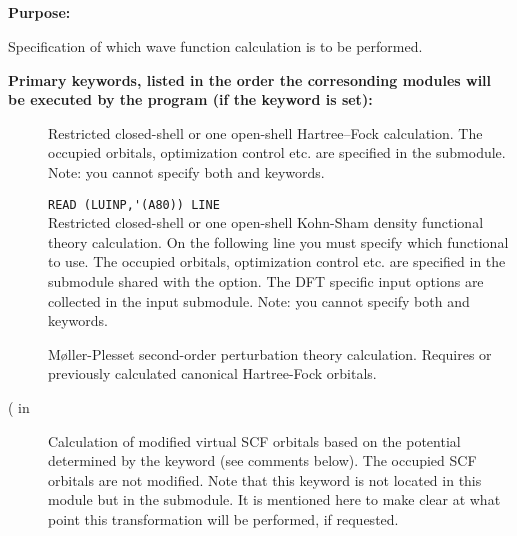 \pagebreak[3]
\subsection{\label{ref-geninp}}

{\bf Purpose:}

Specification of which wave function calculation is to be performed.

{\bf Primary keywords, listed in the order the corresonding modules
 will be executed by the program (if the keyword is set): }

\begin{description}

\item[]
  Restricted closed-shell or one open-shell 
  Hartree--Fock calculation.
  The occupied orbitals, optimization control etc. are specified in the
   submodule.
  Note: you cannot specify both  and  keywords.

\item[]
  \verb"READ (LUINP,'(A80)) LINE" \\
  Restricted closed-shell or one open-shell Kohn-Sham
  density functional theory calculation.
  On the following line you must specify which functional to use.
  The occupied orbitals, optimization control etc. are specified in the
   submodule shared with the  option.
  The DFT specific input options are collected in the  input submodule.
  Note: you cannot specify both  and  keywords.

\item[]
  M{\o}ller-Plesset second-order perturbation theory calculation.
  Requires  or previously calculated canonical Hartree-Fock orbitals.

\item[( in }]
  Calculation of modified virtual SCF orbitals based on the
  potential determined by the keyword (see comments below).
  The occupied SCF orbitals are not modified.
  Note that this keyword is not located in this module but in the
   submodule. It is mentioned here to make clear
  at what point this transformation will be performed, if requested.


\end{description}
